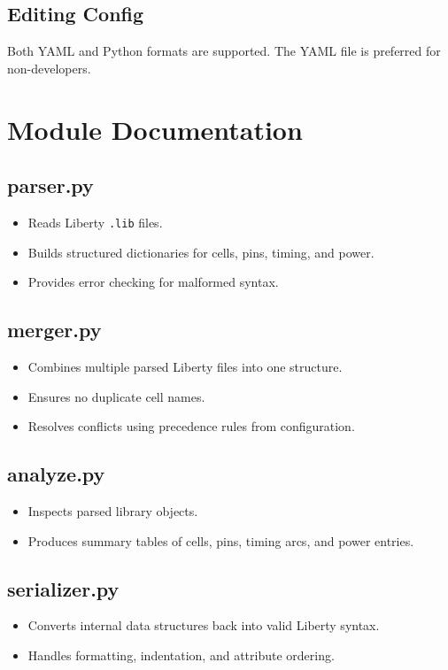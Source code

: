 \documentclass[12pt,a4paper]{article}
\begin{document}
\subsection{Editing Config}
Both YAML and Python formats are supported. The YAML file is preferred for non-developers.

\section{Module Documentation}

\subsection{parser.py}
\begin{itemize}
    \item Reads Liberty \texttt{.lib} files.
    \item Builds structured dictionaries for cells, pins, timing, and power.
    \item Provides error checking for malformed syntax.
\end{itemize}

\subsection{merger.py}
\begin{itemize}
    \item Combines multiple parsed Liberty files into one structure.
    \item Ensures no duplicate cell names.
    \item Resolves conflicts using precedence rules from configuration.
\end{itemize}

\subsection{analyze.py}
\begin{itemize}
    \item Inspects parsed library objects.
    \item Produces summary tables of cells, pins, timing arcs, and power entries.
\end{itemize}

\subsection{serializer.py}
\begin{itemize}
    \item Converts internal data structures back into valid Liberty syntax.
    \item Handles formatting, indentation, and attribute ordering.
\end{itemize}
\end{document}
